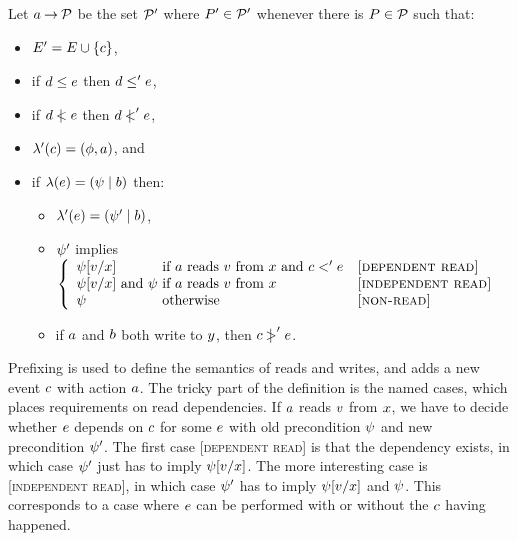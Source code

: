 \begin{definition}
  \label{def:prefix}
Let $a \mathbin\rightarrow \mathcal{P}$ be the set $\mathcal{P}'$ where $P'\in\mathcal{P}'$ whenever
there is $P\in\mathcal{P}$ such that:
\begin{itemize}
\item $E' = E \cup \{c\}$,
\item if $d \le e$ then $d \le' e$,
\item if $d \mathrel{\,\mid\!\!\!<} e$ then $d \mathrel{\,\mid\!\!\!<}' e$,
\item $\lambda'(c) = (\phi, a)$, and
\item if $\lambda(e) = (\psi \mid b)$ then:
  \begin{itemize}
  \item $\lambda'(e) = (\psi' \mid b)$,
  \item $\psi'$ implies \(\left\{\begin{array}{l@{~}ll}
    \bForm[\aVal/\aLoc]                     & \mbox{if $\aAct$ reads $\aVal$ from $\aLoc$ and $\cEv<'\aEv$} & \textsc{[dependent read]} \\
    \bForm[\aVal/\aLoc] \text{ and } \bForm & \mbox{if $\aAct$ reads $\aVal$ from $\aLoc$}                  & \textsc{[independent read]} \\
    \bForm                                  & \mbox{otherwise}                                              & \textsc{[non-read]} \\
  \end{array}\right.\)
  \item if $a$ and $b$ both write to $y$,
    then $c \mathrel{\,\mid\!\!\!>}' e$.
  \end{itemize}
\end{itemize}
\end{definition}
Prefixing is used to define the semantics of reads and writes, and
adds a new event $c$ with action $a$. The tricky part of the
definition is the named cases, which places requirements on read
dependencies.  If $a$ reads $v$ from $x$, we have to
decide whether $e$ depends on $c$ for some $e$ with old
precondition $\psi$ and new precondition $\psi'$. The first case
\textsc{[dependent read]} is that the dependency exists, in which case
$\psi'$ just has to imply $\psi[v/x]$. The more interesting 
case is \textsc{[independent read]}, in which case $\psi'$ has to imply
$\psi[v/x]$ and $\psi$. This corresponds to a case where
$e$ can be performed with or without the $c$ having happened.
